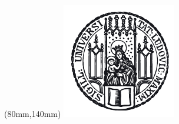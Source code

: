 \begin{titlepage}
\begin{addmargin}[-1cm]{-3.5cm}
\begin{textblock*}{180mm}(80mm,140mm)
\centering
{\includegraphics[width=\textwidth]{graphics/siegel_lmu.pdf}}
\end{textblock*}

\end{addmargin}    
\end{titlepage}
\afterpage{\blankpage}